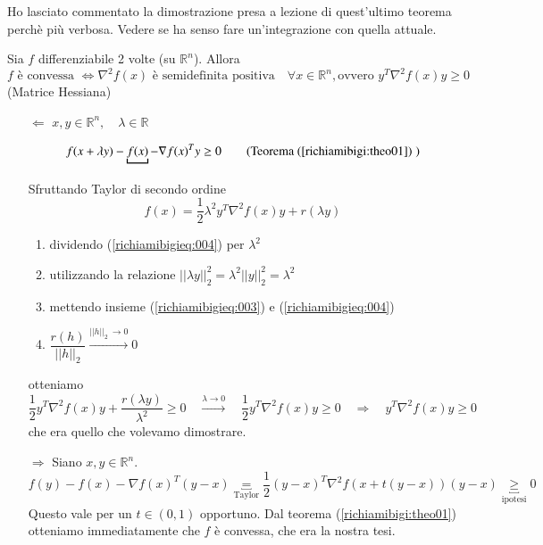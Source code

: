 \begin{todo}
Ho lasciato commentato la dimostrazione presa a lezione
di quest'ultimo teorema perch\`e pi\`u verbosa. Vedere se ha senso
 fare un'integrazione con quella attuale.
\end{todo}

\begin{theo}
\label{richiamibigi:theo02} 
Sia $f$ differenziabile 2 volte (su $\mathbb{R}^{n}$). Allora
 $$ f \text { è convessa } \Longleftrightarrow \nabla^{2} f(x) \text{ è semidefinita positiva} \quad \forall x \in \mathbb{R}^{n},
\text{ovvero } y^{T}\nabla^{2}f(x)y \geq 0
$$
(Matrice Hessiana)
\end{theo}

\begin{thproof}
\begin{itemize}
\item[$ \Longleftarrow$]
 $x,y \in \mathbb{R}^{n}, \quad \lambda  \in \mathbb{R}$

\begin{equation}
  \label{richiamibigieq:003}
f(x+ \lambda y) - \underbracket{f(x)}_{} -\nabla f(x)^{T}y \geq 0
\qquad (\text{Teorema } (\ref{richiamibigi:theo01})\;)   
\end{equation}
Sfruttando Taylor di secondo ordine
\begin{equation}
  \label{richiamibigieq:004}
  f(x) = \frac{1}{2} \lambda^{2} y^{T} \nabla^2 f(x) y + r(\lambda y)
\end{equation}
\begin{enumerate}
\item dividendo (\ref{richiamibigieq:004}) per $\lambda^{2}$
 \item utilizzando la relazione
$||\lambda y||_{2}^{2} = \lambda^{2} ||y||_{2}^{2} = \lambda^{2}$
 \item mettendo insieme (\ref{richiamibigieq:003})  e (\ref{richiamibigieq:004})
\item $\dfrac{r(h)}{||h||_{2}} \xrightarrow{|| h||_{2} \ \to 0} 0$
\end{enumerate}
otteniamo
$$ \frac{1}{2} y^{T} \nabla^{2}f(x) y   + \frac{r(\lambda y)}{\lambda^2}  \geq  0
\quad
\xrightarrow{\lambda \to 0} 
\quad
 \frac{1}{2} y^{T} \nabla^{2}f(x) y   \geq  0
\quad
\Longrightarrow \quad
y^{T} \nabla^{2} f(x) y \geq 0 
$$
che era quello che volevamo dimostrare.

\item[$\Longrightarrow$]
 Siano $x,y \in \mathbb{R}^{n}$. 
$$f(y) - f(x) - \nabla f(x)^{T}(y-x)
\underbracket{ =}_{\text{Taylor}} \frac{1}{2} (y-x)^{T} \nabla^{2} f(x + t(y-x))(y-x) \underbracket{\geq}_{\text{ipotesi}} 0$$
 Questo vale per un $t \in (0,1)$ opportuno.
Dal teorema (\ref{richiamibigi:theo01}) otteniamo immediatamente
che $f$ \`e convessa, che era la nostra tesi.
\end{itemize}
\end{thproof}

